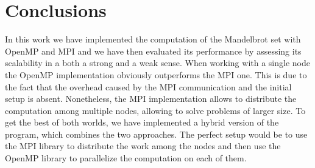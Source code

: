     



\section{Conclusions}
    In this work we have implemented the computation of the Mandelbrot set
    with OpenMP and MPI and we have then evaluated its performance by
    assessing its scalability in a both a strong and a weak sense. 
    When working with a single node the OpenMP implementation obviously
    outperforms the MPI one. This is due to the fact that the overhead
    caused by the MPI communication and the initial setup is absent. 
    Nonetheless, the MPI implementation allows to distribute the computation
    among multiple nodes, allowing to solve problems of larger size.
    To get the best of both worlds, we have implemented a hybrid
    version of the program, which combines the two approaches. The perfect
    setup would be to use the MPI library to distribute the work among the
    nodes and then use the OpenMP library to parallelize the computation
    on each of them.

